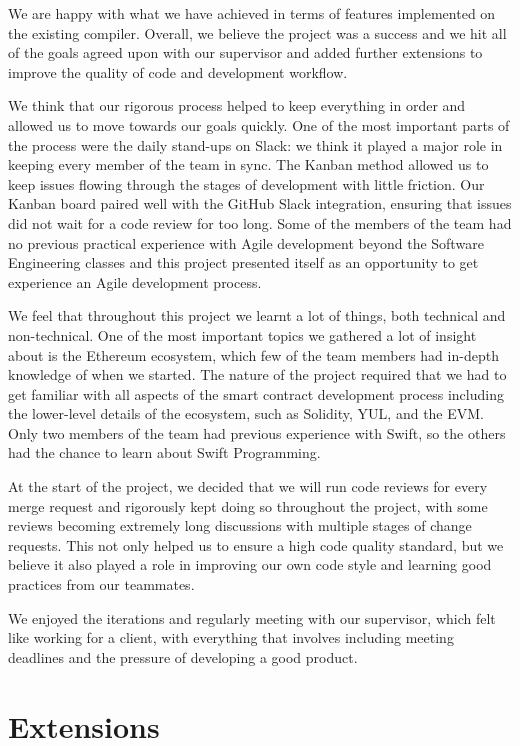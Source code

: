 We are happy with what we have achieved in terms of features implemented on the existing compiler. Overall, we believe the project was a success and we hit all of the goals agreed upon with our supervisor and added further extensions to improve the quality of code and development workflow.

We think that our rigorous process helped to keep everything in order and allowed us to move towards our goals quickly. One of the most important parts of the process were the daily stand-ups on Slack: we think it played a major role in keeping every member of the team in sync. The Kanban method allowed us to keep issues flowing through the stages of development with little friction. Our Kanban board paired well with the GitHub Slack integration, ensuring that issues did not wait for a code review for too long. Some of the members of the team had no previous practical experience with Agile development beyond the Software Engineering classes and this project presented itself as an opportunity to get experience an Agile development process.

We feel that throughout this project we learnt a lot of things, both technical and non-technical. One of the most important topics we gathered a lot of insight about is the Ethereum ecosystem, which few of the team members had in-depth knowledge of when we started. The nature of the project required that we had to get familiar with all aspects of the smart contract development process including the lower-level details of the ecosystem, such as Solidity, YUL, and the EVM. Only two members of the team had previous experience with Swift, so the others had the chance to learn about Swift Programming.

At the start of the project, we decided that we will run code reviews for every merge request and rigorously kept doing so throughout the project, with some reviews becoming extremely long discussions with multiple stages of change requests. This not only helped us to ensure a high code quality standard, but we believe it also played a role in improving our own code style and learning good practices from our teammates.

We enjoyed the iterations and regularly meeting with our supervisor, which felt like working for a client, with everything that involves including meeting deadlines and the pressure of developing a good product.

\section{Extensions}


